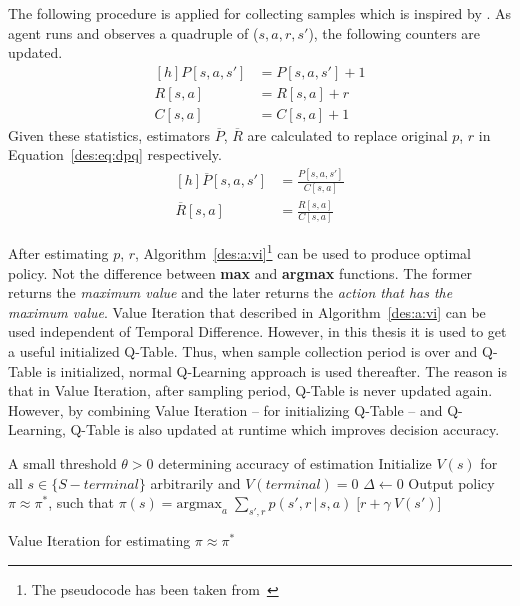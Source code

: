 The following procedure is applied for collecting samples which is inspired by \textcite{dutreilh:hal-01122123}. As agent runs and observes a quadruple of ($s,a,r,s'$), the following counters are updated.
\begin{equation}
\begin{aligned}[h]
P[s,a,s'] &= P[s,a,s'] + 1\\
R[s,a] &= R[s,a] + r \\
C[s,a] &= C[s,a] + 1
\end{aligned}
\end{equation}
Given these statistics, estimators $\overline{P}$, $\overline{R}$ are calculated to replace original $p$, $r$ in Equation~\ref{des:eq:dpq} respectively.
\begin{equation}
\begin{aligned}[h]
\overline{P}[s,a,s'] &= \frac{P[s,a,s']}{C[s,a]} \\
\overline{R}[s,a] &= \frac{R[s,a]}{C[s,a]}
\end{aligned}
\end{equation}

After estimating $p$, $r$, Algorithm~\ref{des:a:vi}\footnote{The pseudocode has been taken from~\textcite{rlIntro}} can be used to produce optimal policy. Not the difference between \textbf{max} and \textbf{argmax} functions. The former returns the \emph{maximum value} and the later returns the \emph{action that has the maximum value}. Value Iteration that described in Algorithm~\ref{des:a:vi} can be used independent of Temporal Difference. However, in this thesis it is used to get a useful initialized Q-Table. Thus, when sample collection period is over and Q-Table is initialized, normal Q-Learning approach is used thereafter. The reason is that in Value Iteration, after sampling period, Q-Table is never updated again. However, by combining Value Iteration -- for initializing Q-Table -- and Q-Learning, Q-Table is also updated at runtime which improves decision accuracy.
\begin{algorithm}[h]
	\DontPrintSemicolon
	
	A small threshold $\theta > 0$ determining accuracy of estimation\;
	Initialize $V(s)$ for all $s \in \{S - terminal\}$ arbitrarily and $V(terminal) = 0$\;
	\BlankLine
	\Repeat{$\Delta < \theta$} {
		$\Delta \gets 0$\;
		\BlankLine
		Output policy $\pi \approx \pi^*$, such that\;
		$\pi(s) = \text{argmax}_a\;\sum_{s',r} p(s',r\,|\,s,a)\;\Big[r + \gamma\:V(s')\Big]$
	}
	\caption{Value Iteration for estimating $\pi \approx \pi^*$}
	\label{des:a:vi}
\end{algorithm}

